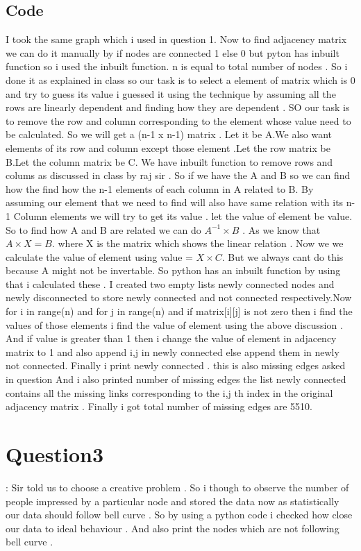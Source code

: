 \documentclass{article}
\begin{document}
\subsection{Code}
I took the same graph which i used in question 1. Now to find adjacency matrix we can do it manually by if nodes are connected 1 else 0 but pyton has inbuilt function so i used the inbuilt function. n is equal to total number of nodes . So i done it as explained in class so our task is to select a element of matrix which is 0 and try to guess its value i guessed it using the technique by assuming all the rows are linearly dependent and finding how they are dependent . SO our task is to remove the row and column corresponding to the element whose value need to be calculated. So we will get a (n-1 x n-1) matrix .
Let it be A.We also want elements of its row and column except those element .Let the row matrix be B.Let the column matrix be C. We have inbuilt function to remove rows and colums as discussed in class by raj sir . So if we have the A and B so we can find how the find how the n-1 elements of each column in A related to B. By assuming our element that we need to find will also have same relation with its n-1 Column elements we will try to get its value . let the value of element be value. So to find how A and B are related we can do   $A^{-1} \times B$ . As we know that $A \times X = B$. where X is the matrix which shows the linear relation . Now we we calculate the value of element using value = $X \times C$. But we always cant do this because A might not be invertable. So python has an inbuilt function by using that i calculated these . I created two empty lists newly connected nodes  and newly disconnected to store newly connected and not connected respectively.Now for i in range(n) and for j in range(n) and if matrix[i][j] is not zero then i find the values of those elements  i find the value of element using the above discussion . And if value is greater than 1 then i change the value of element in adjacency matrix to 1 and also append i,j in newly connected else append them in newly not connected.
Finally i print newly connected . this is also missing edges asked in question  And i also printed number of missing edges  the list newly connected  contains all the missing links corresponding to the i,j th index in the original adjacency matrix . Finally i got 
total number of missing edges are 5510.


\newpage


\section{Question3}: Sir told us to choose a creative problem . So i though to observe the number of people impressed by a particular node and stored the data now as statistically our data should follow bell curve . So by using a python code i checked how close our data to ideal behaviour . And also print the nodes which are not following bell curve . 
\end{document}
